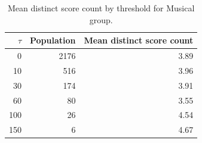 \begin{table}[htbp]
\centering
\small
\begin{tabular}{r r r}
\hline
$\tau$ & Population & Mean distinct score count \\
\hline
0 & 2176 & 3.89 \\
10 & 516 & 3.96 \\
30 & 174 & 3.91 \\
60 & 80 & 3.55 \\
100 & 26 & 4.54 \\
150 & 6 & 4.67 \\
\hline
\end{tabular}
\caption{Mean distinct score count by threshold for Musical group.}
\label{tab:mean-size-Musical-group}
\end{table}
